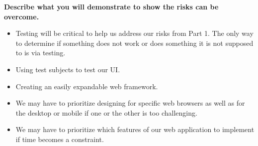 \documentclass[12pt]{article}
\begin{document}
\textbf{Describe what you will demonstrate to show the risks can
be overcome.}

\begin{itemize}
\item Testing will be critical to help us address our risks from Part 1. The only way to determine if something does not work or does something it is not supposed to is via testing. 
\item Using test subjects to test our UI. 
\item Creating an easily expandable web framework.
\item We may have to prioritize designing for specific web browsers as well as for the desktop or mobile if one or the other is too challenging.
\item We may have to prioritize which features of our web application to implement if time becomes a constraint.
\end{itemize}



 
\end{document}
